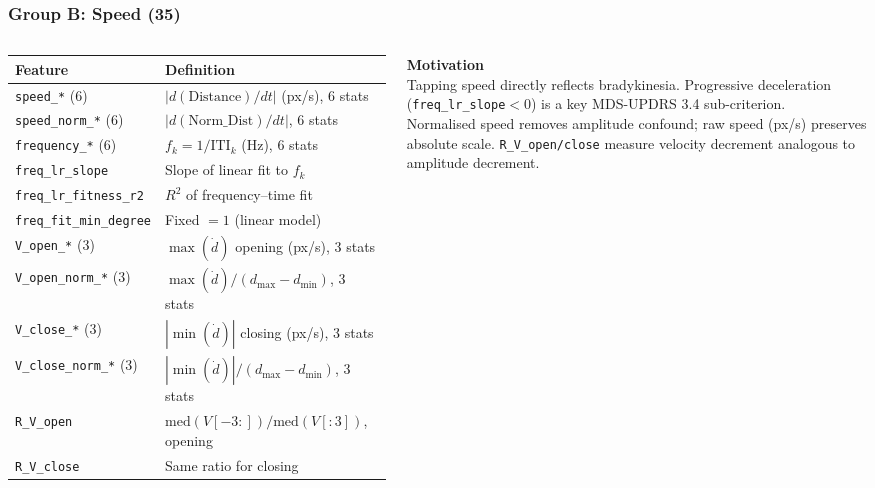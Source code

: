 \documentclass[aspectratio=169]{beamer}
\begin{document}
\begin{frame}
    \frametitle{Group B: Speed (35)}
    \scriptsize
    \begin{columns}[T]
        \renewcommand{\arraystretch}{1.2}
        \begin{tabular}{p{3.8cm}p{3.4cm}}
            \toprule
            \textbf{Feature} & \textbf{Definition} \\
            \midrule
            \texttt{speed\_*} (6) & $|d(\text{Distance})/dt|$ (px/s), 6 stats \\
            \texttt{speed\_norm\_*} (6) & $|d(\text{Norm\_Dist})/dt|$, 6 stats \\
            \texttt{frequency\_*} (6) & $f_k = 1/\text{ITI}_k$ (Hz), 6 stats \\
            \texttt{freq\_lr\_slope} & Slope of linear fit to $f_k$ \\
            \texttt{freq\_lr\_fitness\_r2} & $R^2$ of frequency--time fit \\
            \texttt{freq\_fit\_min\_degree} & Fixed $= 1$ (linear model) \\
            \texttt{V\_open\_*} (3) & $\max(\dot{d})$ opening (px/s), 3 stats \\
            \texttt{V\_open\_norm\_*} (3) & $\max(\dot{d})/(d_\text{max}{-}d_\text{min})$, 3 stats \\
            \texttt{V\_close\_*} (3) & $|\min(\dot{d})|$ closing (px/s), 3 stats \\
            \texttt{V\_close\_norm\_*} (3) & $|\min(\dot{d})|/(d_\text{max}{-}d_\text{min})$, 3 stats \\
            \texttt{R\_V\_open} & $\mathrm{med}(V[-3:])/\mathrm{med}(V[:3])$, opening \\
            \texttt{R\_V\_close} & Same ratio for closing \\
            \bottomrule
        \end{tabular}

        \textbf{Motivation}\\[0.3em]
        Tapping speed directly reflects bradykinesia. Progressive deceleration (\texttt{freq\_lr\_slope}$<$0) is a key MDS-UPDRS 3.4 sub-criterion.\\[0.4em]
        Normalised speed removes amplitude confound; raw speed (px/s) preserves absolute scale. \texttt{R\_V\_open/close} measure velocity decrement analogous to amplitude decrement.
    \end{columns}
\end{frame}
\end{document}
